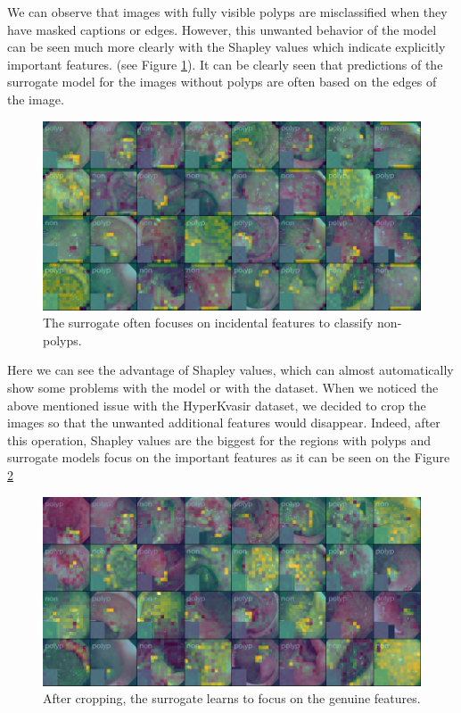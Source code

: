 \documentclass[magisterska,en]{pracamgr}
\begin{document}
We can observe that images with fully visible polyps are misclassified when they have masked captions or edges.
However, this unwanted behavior of the model can be seen much more clearly with the Shapley values which indicate explicitly important features.
(see Figure \ref{Shapley values gastro}). It can be clearly seen that predictions of the surrogate model for the images without polyps are often based on the edges of the image.

\begin{figure}[H]
\centering
\includegraphics[scale=0.5]{./images/shap_gastro_edges.png}
\caption{The surrogate often focuses on incidental features to classify non-polyps.}
\label{Shapley values gastro}
\end{figure}




Here we can see the advantage of Shapley values, which can almost automatically show some problems with the model or with the dataset.
When we noticed the above mentioned issue with the HyperKvasir dataset, we decided to crop the images so that the unwanted additional features would disappear. Indeed, after this operation, Shapley values are the biggest for the regions with polyps and surrogate models focus on the important features as it can be seen on the Figure
\ref{Shapley values for 196 players cropped gastro}

\begin{figure}[H]
\centering
\includegraphics[scale=0.5]{./images/cropped_shap_gastro.png}
\caption{After cropping, the surrogate learns to focus on the genuine features.}
\label{Shapley values for 196 players cropped gastro}
\end{figure}
\end{document}
